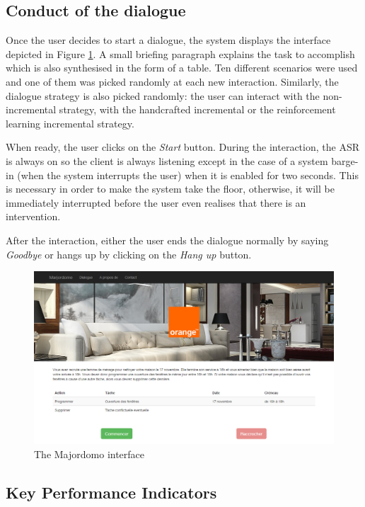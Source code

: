	\subsection{Conduct of the dialogue}
	
		Once the user decides to start a dialogue, the system displays the interface depicted in Figure \ref{fig:majordomo}. A small briefing paragraph explains the task to accomplish which is also synthesised in the form of a table. Ten different scenarios were used and one of them was picked randomly at each new interaction. Similarly, the dialogue strategy is also picked randomly: the user can interact with the non-incremental strategy, with the handcrafted incremental or the reinforcement learning incremental strategy.
		
		When ready, the user clicks on the \textit{Start} button. During the interaction, the ASR is always on so the client is always listening except in the case of a system barge-in (when the system interrupts the user) when it is enabled for two seconds. This is necessary in order to make the system take the floor, otherwise, it will be immediately interrupted before the user even realises that there is an intervention.
		
		After the interaction, either the user ends the dialogue normally by saying \textit{Goodbye} or hangs up by clicking on the \textit{Hang up} button.
	
	\begin{figure}[t]
		\centering
		\includegraphics[scale=0.4]{figures/majordome.png}
		\caption{The Majordomo interface}
		\label{fig:majordomo}
	\end{figure}
	
	\subsection{Key Performance Indicators}
	
